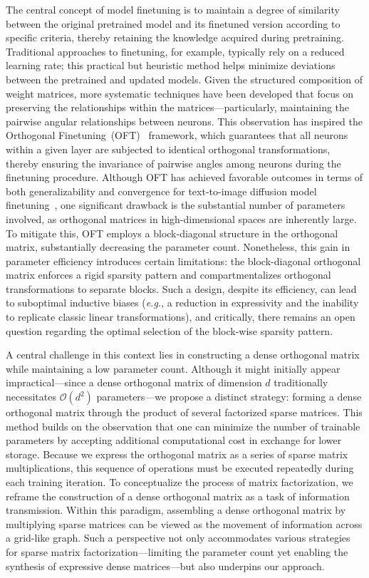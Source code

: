 The central concept of model finetuning is to maintain a degree of similarity between the original pretrained model and its finetuned version according to specific criteria, thereby retaining the knowledge acquired during pretraining. Traditional approaches to finetuning, for example, typically rely on a reduced learning rate; this practical but heuristic method helps minimize deviations between the pretrained and updated models. Given the structured composition of weight matrices, more systematic techniques have been developed that focus on preserving the relationships within the matrices—particularly, maintaining the pairwise angular relationships between neurons. This observation has inspired the Orthogonal Finetuning~(OFT)~\cite{qiu2023controlling} framework, which guarantees that all neurons within a given layer are subjected to identical orthogonal transformations, thereby ensuring the invariance of pairwise angles among neurons during the finetuning procedure. Although OFT has achieved favorable outcomes in terms of both generalizability and convergence for text-to-image diffusion model finetuning~\cite{qiu2023controlling}, one significant drawback is the substantial number of parameters involved, as orthogonal matrices in high-dimensional spaces are inherently large. To mitigate this, OFT employs a block-diagonal structure in the orthogonal matrix, substantially decreasing the parameter count. Nonetheless, this gain in parameter efficiency introduces certain limitations: the block-diagonal orthogonal matrix enforces a rigid sparsity pattern and compartmentalizes orthogonal transformations to separate blocks. Such a design, despite its efficiency, can lead to suboptimal inductive biases (\emph{e.g.}, a reduction in expressivity and the inability to replicate classic linear transformations), and critically, there remains an open question regarding the optimal selection of the block-wise sparsity pattern.

A central challenge in this context lies in constructing a dense orthogonal matrix while maintaining a low parameter count. Although it might initially appear impractical—since a dense orthogonal matrix of dimension $d$ traditionally necessitates $\mathcal{O}(d^2)$ parameters—we propose a distinct strategy: forming a dense orthogonal matrix through the product of several factorized sparse matrices. This method builds on the observation that one can minimize the number of trainable parameters by accepting additional computational cost in exchange for lower storage. Because we express the orthogonal matrix as a series of sparse matrix multiplications, this sequence of operations must be executed repeatedly during each training iteration. To conceptualize the process of matrix factorization, we reframe the construction of a dense orthogonal matrix as a task of information transmission. Within this paradigm, assembling a dense orthogonal matrix by multiplying sparse matrices can be viewed as the movement of information across a grid-like graph. Such a perspective not only accommodates various strategies for sparse matrix factorization—limiting the parameter count yet enabling the synthesis of expressive dense matrices—but also underpins our approach.

